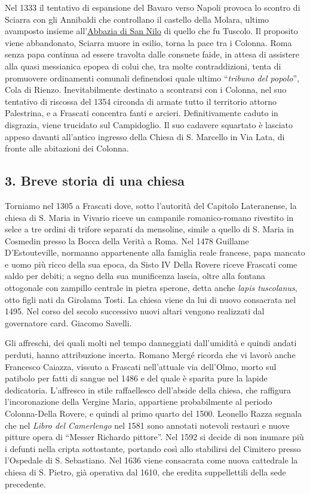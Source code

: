 \documentclass[
  letterpaper,
  DIV=11,
  numbers=noendperiod]{scrartcl}
\begin{document}
Nel 1333 il tentativo di espansione del Bavaro verso Napoli provoca lo
scontro di Sciarra con gli Annibaldi che controllano il castello della
Molara, ultimo avamposto insieme
all'\href{2016-12-31-momenti-fine-comandini.html\#parus\%C3\%ACa-unica-via}{Abbazia
di San Nilo} di quello che fu Tuscolo. Il proposito viene abbandonato,
Sciarra muore in esilio, torna la pace tra i Colonna. Roma senza papa
continua ad essere travolta dalle consuete faide, in attesa di assistere
alla quasi messianica epopea di colui che, tra molte contraddizioni,
tenta di promuovere ordinamenti comunali definendosi quale ultimo
``\emph{tribuno del popolo}'', Cola di Rienzo. Inevitabilmente destinato
a scontrarsi con i Colonna, nel suo tentativo di riscossa del 1354
circonda di armate tutto il territorio attorno Palestrina, e a Frascati
concentra fanti e arcieri. Definitivamente caduto in disgrazia, viene
trucidato sul Campidoglio. Il suo cadavere squartato è lasciato appeso
davanti all'antico ingresso della Chiesa di S. Marcello in Via Lata, di
fronte alle abitazioni dei Colonna.

\subsection{3. Breve storia di una
chiesa}\label{breve-storia-di-una-chiesa}

Torniamo nel 1305 a Frascati dove, sotto l'autorità del Capitolo
Lateranense, la chiesa di S. Maria in Vivario riceve un campanile
romanico-romano rivestito in selce a tre ordini di trifore separati da
mensoline, simile a quello di S. Maria in Cosmedin presso la Bocca della
Verità a Roma. Nel 1478 Guillame D'Estouteville, normanno appartenente
alla famiglia reale francese, papa mancato e uomo più ricco della sua
epoca, da Sisto IV Della Rovere riceve Frascati come saldo per debiti; a
segno della sua munificenza lascia, oltre alla fontana ottogonale con
zampillo centrale in pietra sperone, detta anche \emph{lapis
tuscolanus}, otto figli nati da Girolama Tosti. La chiesa viene da lui
di nuovo consacrata nel 1495. Nel corso del secolo successivo nuovi
altari vengono realizzati dal governatore card. Giacomo Savelli.

Gli affreschi, dei quali molti nel tempo danneggiati dall'umidità e
quindi andati perduti, hanno attribuzione incerta. Romano Mergé ricorda
che vi lavorò anche Francesco Caiazza, vissuto a Frascati nell'attuale
via dell'Olmo, morto sul patibolo per fatti di sangue nel 1486 e del
quale è sparita pure la lapide dedicatoria. L'affresco in stile
raffaellesco dell'abside della chiesa, che raffigura l'incoronazione
della Vergine Maria, appartiene probabilmente al periodo Colonna-Della
Rovere, e quindi al primo quarto del 1500. Leonello Razza segnala che
nel \emph{Libro del Camerlengo} nel 1581 sono annotati notevoli restauri
e nuove pitture opera di ``Messer Richardo pittore''. Nel 1592 si decide
di non inumare più i defunti nella cripta sottostante, portando così
allo stabilirsi del Cimitero presso l'Ospedale di S. Sebastiano. Nel
1636 viene consacrata come nuova cattedrale la chiesa di S. Pietro, già
operativa dal 1610, che eredita suppellettili della sede precedente.
\end{document}
